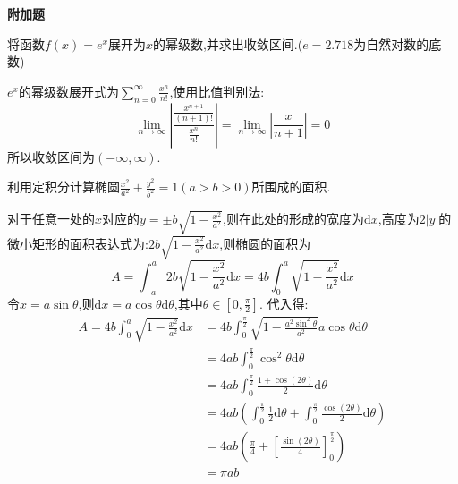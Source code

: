 \begin{questions}
	\begin{center}
		\large\bf 附加题
	\end{center}
	\question 将函数$f(x)=e^x$展开为$x$的幂级数,并求出收敛区间.($e=2.718$为自然对数的底数)
	\begin{solution}
		$e^x$的幂级数展开式为$\displaystyle\sum_{n=0}^{\infty}\frac{x^n}{n!}$,使用比值判别法:
		\begin{equation*}
			\lim_{n\to\infty}\left| \frac{\frac{x^{n+1}}{(n+1)!}}{\frac{x^n}{n!}}\right| =
			\lim_{n\to\infty}\left|\frac{x}{n+1}\right|
			= 0
		\end{equation*}
		所以收敛区间为$(-\infty, \infty)$.
	\end{solution}

	\question 利用定积分计算椭圆$\frac{x^2}{a^2} + \frac{y^2}{b^2} = 1 (a > b > 0)$所围成的面积.
	\begin{solution}
		对于任意一处的$x$对应的$y=\pm b\sqrt{1 -
				\frac{x^2}{a^2}}$,则在此处的形成的宽度为$\mathrm{d}x$,高度为$2|y|$的微小矩形的面积表达式为:$2b\sqrt{1-\frac{x^2}{a^2}}\mathrm{d}x$,则椭圆的面积为
		\begin{equation*}
			A = \int_{-a}^{a}2b\sqrt{1-\frac{x^2}{a^2}}\mathrm{d}x = 4b\int_{0}^{a}\sqrt{1-\frac{x^2}{a^2}}\mathrm{d}x
		\end{equation*}
		令$x=a\sin\theta$,则$\mathrm{d}x = a\cos\theta\mathrm{d}\theta$,其中$\theta \in [0, \frac\pi2]$.
		代入得:
		\begin{align*}
			A = 4b\int_{0}^{a}\sqrt{1-\frac{x^2}{a^2}}\mathrm{d}x
			 & = 4b\int_0^{\frac\pi2}\sqrt{1 -
			\frac{a^2\sin^2\theta}{a^2}}a\cos\theta\mathrm{d}\theta                              \\
			 & = 4ab\int_0^{\frac\pi2}\cos^2\theta\mathrm{d}\theta                               \\
			 & = 4ab\int_0^{\frac\pi2}\frac{1+\cos(2\theta)}{2}\mathrm{d}\theta                  \\
			 & = 4ab\left(\int_0^{\frac\pi2}\frac12\mathrm{d}\theta +
			\int_0^{\frac\pi2}\frac{\cos(2\theta)}{2}\mathrm{d}\theta\right)                     \\
			 & = 4ab\left(\frac\pi4  + \left[\frac{\sin(2\theta)}{4}\right]_0^{\frac\pi2}\right) \\
			 & = \pi ab
		\end{align*}
	\end{solution}

\end{questions}
